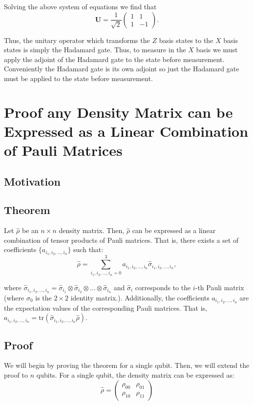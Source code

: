 \documentclass[12pt]{article}
\begin{document}
    Solving the above system of equations we find that
    \begin{equation*}
        \mathbf{U} = \frac{1}{\sqrt{2}} \begin{pmatrix} 1 & 1 \\ 1 & -1 \end{pmatrix}.
    \end{equation*}

    Thus, the unitary operator which transforms the $Z$ basis states to the $X$ basis states is simply the Hadamard gate. Thus, to measure in the $X$ basis we must apply the adjoint of the Hadamard gate to the state before measurement. Conveniently the Hadamard gate is its own adjoint so just the Hadamard gate must be applied to the state before measurement.

    \section{Proof any Density Matrix can be Expressed as a Linear Combination of Pauli Matrices}
    \subsection{Motivation}
    
    \subsection{Theorem}
    Let $\hat{\rho}$ be an $n \times n$ density matrix. Then, $\hat{\rho}$ can be expressed as a linear combination of tensor products of Pauli matrices. That is, there exists a set of coefficients $\{a_{i_1, i_2, \dots, i_n}\}$ such that:
    \begin{equation}
        \hat{\rho} = \sum_{i_1,i_2,\dots,i_n = 0}^{3} a_{i_1, i_2, \dots, i_n} \hat{\sigma}_{i_1,i_2,\dots,i_n},
    \end{equation}

    where $\hat{\sigma}_{i_1,i_2,\dots,i_n} = \hat{\sigma}_{i_1} \otimes \hat{\sigma}_{i_2} \otimes \dots \otimes \hat{\sigma}_{i_n}$ and $\hat{\sigma}_{i}$ corresponds to the $i$-th Pauli matrix (where $\sigma_0$ is the $2 \times 2$ identity matrix.). Additionally, the coefficients $a_{i_1, i_2, \dots, i_n}$ are the expectation values of the corresponding Pauli matrices. That is, $a_{i_1, i_2, \dots, i_n} = \text{tr}(\hat{\sigma}_{i_1,i_2,\dots,i_n}\hat{\rho})$.

    \subsection{Proof}
    We will begin by proving the theorem for a single qubit. Then, we will extend the proof to $n$ qubits. For a single qubit, the density matrix can be expressed as:
    \begin{equation}
        \hat{\rho} = 
        \begin{pmatrix}
            \rho_{00} & \rho_{01} \\
            \rho_{10} & \rho_{11}
        \end{pmatrix}
    \end{equation}
\end{document}
